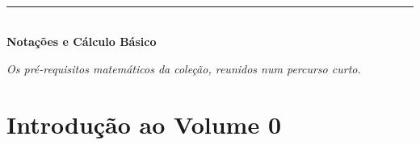 \documentclass[12pt,a4paper]{article}
\numberwithin{equation}{section}
\numberwithin{table}{section}
\numberwithin{figure}{section}
\begin{document}




\clearpage
{}
\tableofcontents

\clearpage
{}
{}
\listoffigures

\clearpage
{}
{}
\listoftables



\clearpage
{}


\clearpage
\thispagestyle{empty}
{}
\vspace*{\fill}
\begin{center}
	{\color{capaBlue}\sffamily\bfseries\Large{}}\\[3mm]
	{\color{capaOuro}\rule{42mm}{2.2pt}}\\[9mm]
	{\huge\bfseries Notações e Cálculo Básico}\\[7mm]
	\begin{minipage}{0.68\textwidth}
		\centering\itshape\small Os pré-requisitos matemáticos da coleção, reunidos num percurso curto.
	\end{minipage}
\end{center}
\vspace*{\fill}
\clearpage

\setcounter{section}{0}
\renewcommand{\theHsection}{v0.\arabic{section}}
\renewcommand{\theHequation}{v0.\theequation}
\renewcommand{\theHfigure}{v0.\thefigure}
\renewcommand{\theHtable}{v0.\thetable}
	

	


\newpage




\clearpage
\section{Introdução ao Volume 0}\label{sec:v0-intro}
\end{document}

